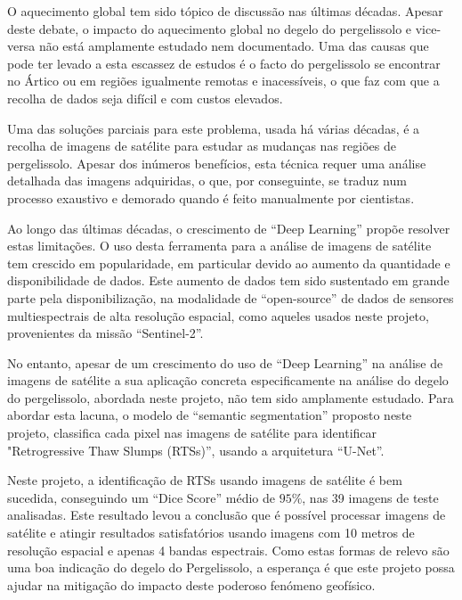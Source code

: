 O aquecimento global tem sido tópico de discussão nas últimas décadas. Apesar deste debate, o impacto do aquecimento global no degelo do pergelissolo e vice-versa não está amplamente estudado nem documentado. Uma das causas que pode ter levado a esta escassez de estudos é o facto do pergelissolo se encontrar no Ártico ou em regiões igualmente remotas e inacessíveis, o que faz com que a recolha de dados seja difícil e com custos elevados.

Uma das soluções parciais para este problema, usada há várias décadas, é a recolha de imagens de satélite para estudar as mudanças nas regiões de pergelissolo. Apesar dos inúmeros benefícios, esta técnica requer uma análise detalhada das imagens adquiridas, o que, por conseguinte, se traduz num processo exaustivo e demorado quando é feito manualmente por cientistas. 

Ao longo das últimas décadas, o crescimento de “Deep Learning” propõe resolver estas limitações. O uso desta ferramenta para a análise de imagens de satélite tem crescido em popularidade, em particular devido ao aumento da quantidade e disponibilidade de dados. Este aumento de dados tem sido sustentado em grande parte pela disponibilização, na modalidade de “open-source” de dados de sensores multiespectrais de alta resolução espacial, como aqueles usados neste projeto, provenientes da missão “Sentinel-2”.

No entanto, apesar de um crescimento do uso de “Deep Learning” na análise de imagens de satélite a sua aplicação concreta especificamente na análise do degelo do pergelissolo, abordada neste projeto, não tem sido amplamente estudado. Para abordar esta lacuna, o modelo de “semantic segmentation” proposto neste projeto, classifica cada pixel nas imagens de satélite para identificar "Retrogressive Thaw Slumps (RTSs)”, usando a arquitetura “U-Net”.


Neste projeto, a identificação de RTSs usando imagens de satélite é bem sucedida, conseguindo um “Dice Score” médio de $95\%$, nas 39 imagens de teste analisadas. Este resultado levou a conclusão que é possível processar imagens de satélite e atingir resultados satisfatórios usando imagens com 10 metros de resolução espacial e apenas 4 bandas espectrais. Como estas formas de relevo são uma boa indicação do degelo do Pergelissolo, a esperança é que este projeto possa ajudar na mitigação do impacto deste poderoso fenómeno geofísico.

